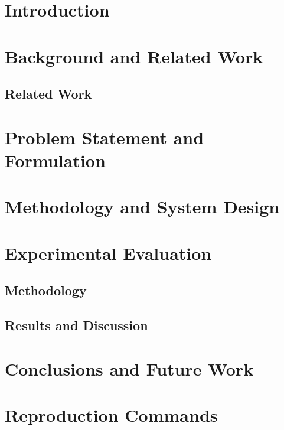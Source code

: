 \documentclass{Configuration_Files/PoliMi3i_thesis}
\begin{document}
\chapter{Introduction}


\chapter{Background and Related Work}

\section{Related Work}


\chapter{Problem Statement and Formulation}


\chapter{Methodology and System Design}


\chapter{Experimental Evaluation}
\section{Methodology}

\section{Results and Discussion}


\chapter{Conclusions and Future Work}




\cleardoublepage
{}
\appendix
\chapter{Reproduction Commands}

\end{document}
